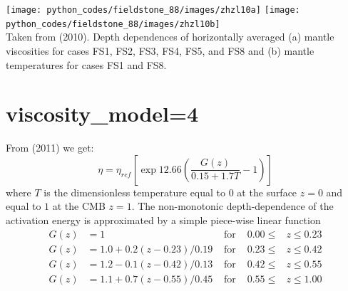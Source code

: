 \begin{center}
\texttt{[image: python\_codes/fieldstone\_88/images/zhzl10a]}
\texttt{[image: python\_codes/fieldstone\_88/images/zhzl10b]}\\
{\captionfont Taken from \textcite{zhzl10} (2010).
Depth dependences of horizontally averaged
(a) mantle viscosities for cases FS1, FS2, FS3, FS4, FS5,
and FS8 and (b) mantle temperatures for cases FS1 and FS8.}
\end{center}


\newpage
\section*{viscosity\_model=4}

From \textcite{mayw11} (2011) we get: 
\[
\eta = \eta_{ref}\left[  \exp 12.66\left(   \frac{G(z)}{0.15+1.7T}-1  \right) \right]
\]
where $T$ is the dimensionless temperature equal to $0$ at the surface
$z=0$ and equal to $1$ at the CMB $z=1$.
The non-monotonic depth-dependence of the activation energy
is approximated by a simple piece-wise linear function
\begin{align}
G(z)&=1                    & \text{ for }  &0.00\leq &z \leq 0.23 \nonumber\\
G(z)&=1.0+0.2(z-0.23)/0.19 & \text{ for }  &0.23\leq &z \leq 0.42 \nonumber\\
G(z)&=1.2-0.1(z-0.42)/0.13 & \text{ for }  &0.42\leq &z \leq 0.55 \nonumber\\
G(z)&=1.1+0.7(z-0.55)/0.45 & \text{ for }  &0.55\leq &z \leq 1.00 \nonumber
\end{align}

